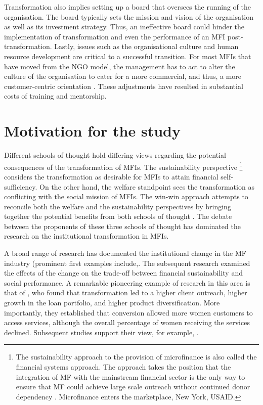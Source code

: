 \documentclass[a4paper,nobind]{templates/ociamthesis}
\begin{document}
Transformation also implies setting up a board that oversees the running of the organisation. The board typically sets the mission and vision of the organisation as well as its investment strategy. Thus, an ineffective board could hinder the implementation of transformation \autocite{campion1999institutional} and even the performance of an MFI post-transformation. Lastly, issues such as the organisational culture and human resource development are critical to a successful transition. For most MFIs that have moved from the NGO model, the management has to act to alter the culture of the organisation to cater for a more commercial, and thus, a more customer-centric orientation \autocite{christen2001commercialization}. These adjustments have resulted in substantial costs of training and mentorship.

\hypertarget{motivation-for-the-study}{%
\section{Motivation for the study}\label{motivation-for-the-study}}

\noindent Different schools of thought hold differing views regarding the potential consequences of the transformation of MFIs. The sustainability perspective \footnote{The sustainability approach to the provision of microfinance is also called the financial systems approach. The approach takes the position that the integration of MF with the mainstream financial sector is the only way to ensure that MF could achieve large scale outreach without continued donor dependency \autocite{rhyne1999microfinance}. Microfinance enters the marketplace, New York, USAID.} considers the transformation as desirable for MFIs to attain financial self-sufficiency. On the other hand, the welfare standpoint sees the transformation as conflicting with the social mission of MFIs. The win-win approach attempts to reconcile both the welfare and the sustainability perspectives by bringing together the potential benefits from both schools of thought \autocite{kodongo2013individual}. The debate between the proponents of these three schools of thought has dominated the research on the institutional transformation in MFIs.

A broad range of research has documented the institutional change in the MF industry (prominent first examples include,\autocite{ledgerwood1998microfinance,ledgerwood2006transforming}. The subsequent research examined the effects of the change on the trade-off between financial sustainability and social performance. A remarkable pioneering example of research in this area is that of \textcite{frank2008stemming}, who found that transformation led to a higher client outreach, higher growth in the loan portfolio, and higher product diversification. More importantly, they established that conversion allowed more women customers to access services, although the overall percentage of women receiving the services declined. Subsequent studies support their view, for example, \autocites[ ]{hartarska2012governance,bos2015practice}{d2017ngos}.
\end{document}
